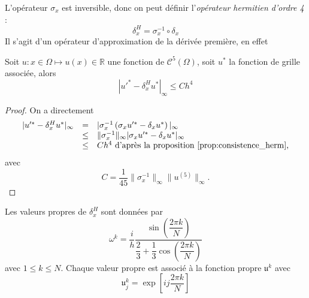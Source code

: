 L'opérateur $\sigma_x$ est inversible, donc on peut définir l'\textit{opérateur hermitien d'ordre 4} :
\begin{equation}
\delta_x^H = \sigma_x^{-1} \circ \delta_x
\label{def:herm_4}
\end{equation}
Il s'agit d'un opérateur d'approximation de la dérivée première, en effet

\begin{theoreme}
Soit $u : x \in \Omega \mapsto u(x) \in \mathbb{R}$ une fonction de $\mathcal{C}^5 ( \Omega )$, soit $u^*$ la fonction de grille associée, alors
\begin{equation}
| u'^* -  \delta_x^H u^* |_{\infty} \leq C h^4
\end{equation}
\label{prop:consistence_herm2}
\end{theoreme}

\begin{proof}
On a directement 
\begin{equation*}
\begin{array}{rcl}
| u'^* -  \delta_x^H u^* |_{\infty} & = & | \sigma_x^{-1} \left( \sigma_x u'^* - \delta_x u^* \right) |_{\infty} \\
	& \leq & \| \sigma^{-1}_x \|_{\infty} |\sigma_x u'^* - \delta_x u^* |_{\infty}\\
	& \leq & C h^4 \text{ d'après la proposition \ref{prop:consistence_herm},}
\end{array}
\end{equation*}
avec
\begin{equation}
C = \dfrac{1}{45} \| \sigma^{-1}_x \|_{\infty} \| u^{(5)} \|_{\infty}.
\end{equation}
\end{proof}

\begin{proposition}
Les valeurs propres de $\delta_x^H$ sont données par 
\begin{equation}
\omega^k = \dfrac{i}{h} \dfrac{\sin \left( \dfrac{2 \pi k}{N} \right)}{\dfrac{2}{3} + \dfrac{1}{3} \cos \left( \dfrac{2 \pi k}{N} \right)}
\end{equation}
avec $1 \leq k \leq N$. Chaque valeur propre est associé à la fonction propre $\mathfrak{u}^k$ avec 
\begin{equation}
\mathfrak{u}_j^k = \exp \left[ i j \dfrac{2 \pi k}{N} \right]
\end{equation}
\label{prop:vp_herm}
\end{proposition}

